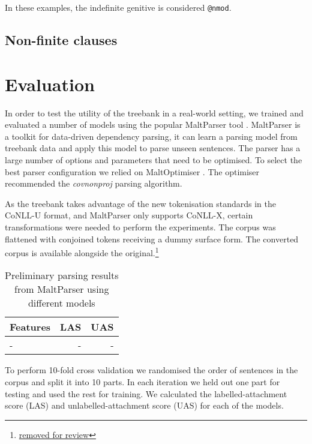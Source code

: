 \documentclass[a4paper,11pt, onecolumn,twoside]{article}
\makeatletter
\newcommand{\udtag}[1]{\texttt{@#1}}
\makeatother
\begin{document}
In these examples, the indefinite genitive is considered \udtag{nmod}.


\subsection{Non-finite clauses}

\section{Evaluation}


In order to test the utility of the treebank in a real-world setting, we trained
and evaluated a number of models using the popular MaltParser tool \citep{nivre07}.
MaltParser is a toolkit for data-driven dependency parsing, it can learn a parsing
model from treebank data and apply this model to parse unseen sentences. The parser
has a large number of options and parameters that need to be optimised.
To select the best parser configuration we relied on
MaltOptimiser \citep{ballesteros15}. The optimiser recommended the \emph{covnonproj}
parsing algorithm.

As the treebank takes advantage of the new tokenisation standards in the CoNLL-U format,
and MaltParser only supports CoNLL-X, certain transformations were needed to perform
the experiments. The corpus was flattened with conjoined tokens receiving a dummy
surface form. The converted corpus is available alongside the original.\footnote{\url{removed for review}}


\begin{table}
  \centering
  \begin{tabular}{|l|r|r|}
    \hline
    \textbf{Features} & \textbf{LAS} & \textbf{UAS} \\
    \hline
     - & - & - \\
    \hline
  \end{tabular}
  \caption{Preliminary parsing results from MaltParser using different models}
  \label{table:eval}
\end{table}

To perform 10-fold cross validation we randomised the order of sentences in the corpus
and split it into 10 parts. In each iteration we held out one part for testing and used
the rest for training. We calculated the labelled-attachment score (LAS) and
unlabelled-attachment score (UAS) for each of the models.
\end{document}
